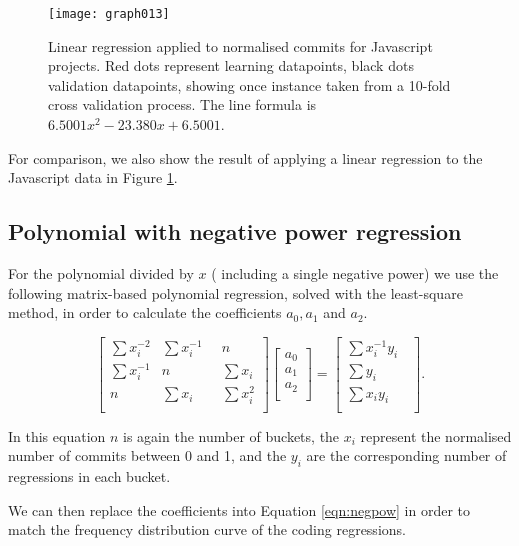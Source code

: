 \documentclass[10pt,journal,compsoc]{IEEEtran}
\begin{document}
\begin{figure}[t]
\centering
\texttt{[image: graph013]}%
\caption{\label{fig:javascript-linear}Linear regression applied to normalised commits for Javascript projects. Red dots represent learning datapoints, black dots validation datapoints, showing once instance taken from a 10-fold cross validation process. The line formula is $6.5001 x^{2} -23.380 x + 6.5001$.}
\end{figure}

For comparison, we also show the result of applying a linear regression to the Javascript data in Figure \ref{fig:javascript-linear}.

\subsection{Polynomial with negative power regression}

For the polynomial divided by $x$ (\ie\/ including a single negative power) we use the following matrix-based polynomial regression, solved with the least-square method, in order to calculate the coefficients $a_0, a_1$ and $a_2$.

\begin{equation}
\begin{bmatrix}
\sum x_i^{-2} & \sum x_i^{-1}        & n            \\
\sum x_i^{-1} & n                    & \sum x_i     \\
n             & \sum x_i \phantom{-} & \sum x_i^{2} \\
\end{bmatrix}
\begin{bmatrix}
a_0 \\
a_1 \\
a_2 \\
\end{bmatrix}
=
\begin{bmatrix}
\sum x_i^{-1} y_i        \\
\sum y_i \phantom{x_i -} \\
\sum x_i y_i \phantom{-} \\
\end{bmatrix}.
\end{equation}

In this equation $n$ is again the number of buckets, the $x_i$ represent the normalised number of commits between 0 and 1, and the $y_i$ are the corresponding number of regressions in each bucket.

We can then replace the coefficients into Equation \ref{eqn:negpow} in order to match the frequency distribution curve of the coding regressions.
\end{document}
